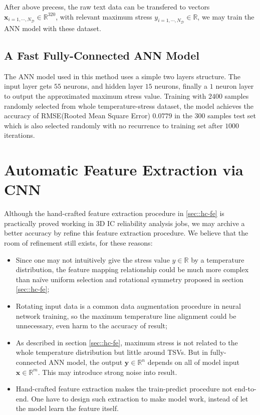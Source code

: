 After above precess, the raw text data can be transfered to vectors 
$\mathbf{x}_{i=1,\cdots,N_\mathcal{D}} \in \mathbb{R}^{320}$, 
with relevant maximum stress 
$y_{i=1,\cdots,N_\mathcal{D}} \in \mathbb{R}$,
we may train the ANN model with these dataset.

\subsection{A Fast Fully-Connected ANN Model}
The ANN model used in this method uses a simple two layers structure. 
The input layer gets $55$ neurons, and hidden layer $15$ neurons, finally a $1$ neuron layer
to output the approximated maximum stress value.
Training with $2400$ samples randomly selected from whole temperature-stress dataset,
the model achieves the accuracy of RMSE(Rooted Mean Square Error) $0.0779$ in the $300$ samples test set 
which is also selected randomly with no recurrence to training set after $1000$ iterations.

\section{Automatic Feature Extraction via CNN}
Although the hand-crafted feature extraction procedure in \ref{sec::hc-fe} is 
practically proved working in 3D IC reliability analysis jobs,
we may archive a better accuracy by refine this feature extraction procedure.
We believe that the room of refinement still exists, for these reasons:
\begin{itemize}
    \item Since one may not intuitively give the stress value $y\in\mathbb{R}$
    by a temperature distribution, the feature mapping relationship could be
    much more complex than na\"ive uniform selection and rotational symmetry proposed
    in section \ref{sec::hc-fe};
    
    \item Rotating input data is a common data augmentation procedure in neural
    network training\cite{Goodfellow2016Deep}, 
    so the maximum temperature line alignment could be unnecessary,
    even harm to the accuracy of result;
    
    \item As described in section \ref{sec::hc-fe}, maximum stress is not related to
    the whole temperature distribution but little around TSVs. But in fully-connected
    ANN model, the output $\mathbf{y}\in\mathbb{R}^n$ depends on all of model input 
    $\mathbf{x}\in\mathbb{R}^m$. This may introduce strong noise into result.
    
    \item Hand-crafted feature extraction makes the train-predict procedure not
    end-to-end. One have to design such extraction to make model work, instead of
    let the model learn the feature itself.
\end{itemize}


